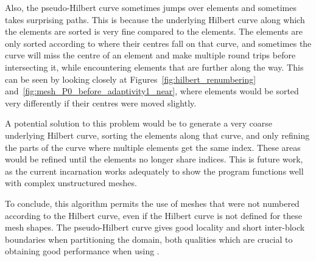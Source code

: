 Also, the pseudo-Hilbert curve sometimes jumps over elements and sometimes takes surprising paths.
This is because the underlying Hilbert curve along which the elements are sorted is very fine
compared to the elements. The elements are only sorted according to where their centres fall on that
curve, and sometimes the curve will miss the centre of an element and make multiple round trips
before intersecting it, while encountering elements that are further along the way. This can be seen
by looking closely at Figures~\ref{fig:hilbert_renumbering}
and~\ref{fig:mesh_P0_before_adaptivity1_near}, where elements would be sorted very differently if
their centres were moved slightly.

A potential solution to this problem would be to generate a very coarse underlying Hilbert curve,
sorting the elements along that curve, and only refining the parts of the curve where multiple
elements get the same index. These areas would be refined until the elements no longer share
indices. This is future work, as the current incarnation works adequately to show the program
functions well with complex unstructured meshes.

To conclude, this algorithm permits the use of meshes that were not numbered according to the
Hilbert curve, even if the Hilbert curve is not defined for these mesh shapes. The pseudo-Hilbert
curve gives good locality and short inter-block boundaries when partitioning the domain, both
qualities which are crucial to obtaining good performance when using .
